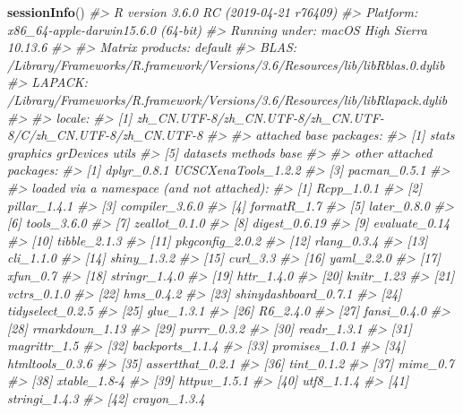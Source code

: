 \documentclass[nofonts,]{tufte-handout}
\newenvironment{Shaded}{\begin{snugshade}}{\end{snugshade}}
\newcommand{\CommentTok}[1]{\textcolor[rgb]{0.56,0.35,0.01}{\textit{#1}}}
\newcommand{\KeywordTok}[1]{\textcolor[rgb]{0.13,0.29,0.53}{\textbf{#1}}}
\newcommand{\NormalTok}[1]{#1}
\begin{document}
\begin{Shaded}
\begin{Highlighting}[]
\KeywordTok{sessionInfo}\NormalTok{()}
\CommentTok{#> R version 3.6.0 RC (2019-04-21 r76409)}
\CommentTok{#> Platform: x86_64-apple-darwin15.6.0 (64-bit)}
\CommentTok{#> Running under: macOS High Sierra 10.13.6}
\CommentTok{#> }
\CommentTok{#> Matrix products: default}
\CommentTok{#> BLAS:   /Library/Frameworks/R.framework/Versions/3.6/Resources/lib/libRblas.0.dylib}
\CommentTok{#> LAPACK: /Library/Frameworks/R.framework/Versions/3.6/Resources/lib/libRlapack.dylib}
\CommentTok{#> }
\CommentTok{#> locale:}
\CommentTok{#> [1] zh_CN.UTF-8/zh_CN.UTF-8/zh_CN.UTF-8/C/zh_CN.UTF-8/zh_CN.UTF-8}
\CommentTok{#> }
\CommentTok{#> attached base packages:}
\CommentTok{#> [1] stats     graphics  grDevices utils    }
\CommentTok{#> [5] datasets  methods   base     }
\CommentTok{#> }
\CommentTok{#> other attached packages:}
\CommentTok{#> [1] dplyr_0.8.1         UCSCXenaTools_1.2.2}
\CommentTok{#> [3] pacman_0.5.1       }
\CommentTok{#> }
\CommentTok{#> loaded via a namespace (and not attached):}
\CommentTok{#>  [1] Rcpp_1.0.1          }
\CommentTok{#>  [2] pillar_1.4.1        }
\CommentTok{#>  [3] compiler_3.6.0      }
\CommentTok{#>  [4] formatR_1.7         }
\CommentTok{#>  [5] later_0.8.0         }
\CommentTok{#>  [6] tools_3.6.0         }
\CommentTok{#>  [7] zeallot_0.1.0       }
\CommentTok{#>  [8] digest_0.6.19       }
\CommentTok{#>  [9] evaluate_0.14       }
\CommentTok{#> [10] tibble_2.1.3        }
\CommentTok{#> [11] pkgconfig_2.0.2     }
\CommentTok{#> [12] rlang_0.3.4         }
\CommentTok{#> [13] cli_1.1.0           }
\CommentTok{#> [14] shiny_1.3.2         }
\CommentTok{#> [15] curl_3.3            }
\CommentTok{#> [16] yaml_2.2.0          }
\CommentTok{#> [17] xfun_0.7            }
\CommentTok{#> [18] stringr_1.4.0       }
\CommentTok{#> [19] httr_1.4.0          }
\CommentTok{#> [20] knitr_1.23          }
\CommentTok{#> [21] vctrs_0.1.0         }
\CommentTok{#> [22] hms_0.4.2           }
\CommentTok{#> [23] shinydashboard_0.7.1}
\CommentTok{#> [24] tidyselect_0.2.5    }
\CommentTok{#> [25] glue_1.3.1          }
\CommentTok{#> [26] R6_2.4.0            }
\CommentTok{#> [27] fansi_0.4.0         }
\CommentTok{#> [28] rmarkdown_1.13      }
\CommentTok{#> [29] purrr_0.3.2         }
\CommentTok{#> [30] readr_1.3.1         }
\CommentTok{#> [31] magrittr_1.5        }
\CommentTok{#> [32] backports_1.1.4     }
\CommentTok{#> [33] promises_1.0.1      }
\CommentTok{#> [34] htmltools_0.3.6     }
\CommentTok{#> [35] assertthat_0.2.1    }
\CommentTok{#> [36] tint_0.1.2          }
\CommentTok{#> [37] mime_0.7            }
\CommentTok{#> [38] xtable_1.8-4        }
\CommentTok{#> [39] httpuv_1.5.1        }
\CommentTok{#> [40] utf8_1.1.4          }
\CommentTok{#> [41] stringi_1.4.3       }
\CommentTok{#> [42] crayon_1.3.4}
\end{Highlighting}
\end{Shaded}
\end{document}
